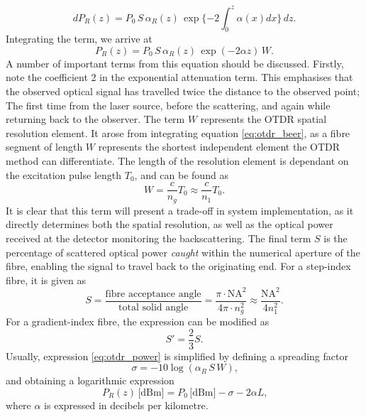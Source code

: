 \documentclass{standalone}
\begin{document}
\begin{equation} \label{eq:otdr_beer}
dP_R(z) = P_0 \, S \, \alpha_R(z) \, \exp\{ -2 \int_{0}^{z} \alpha(x) dx \} \, dz \textrm{.}
\end{equation}
Integrating the term, we arrive at
\begin{equation} \label{eq:otdr_power}
P_R(z) = P_0 \, S \, \alpha_R(z) \, \exp\left(-2 \alpha z\right) \, W \textrm{.}
\end{equation}
A number of important terms from this equation should be discussed. Firstly, note the coefficient 2 in the exponential attenuation term. This emphasises that the observed optical signal has travelled twice the distance to the observed point; The first time from the laser source, before the scattering, and again while returning back to the observer. The term $W$ represents the OTDR spatial resolution element. It arose from integrating equation \ref{eq:otdr_beer}, as a fibre segment of length $W$ represents the shortest independent element the OTDR method can differentiate. The length of the resolution element is dependant on the excitation pulse length $T_0$, and can be found as
\begin{equation} \label{eq:otdr_resolution}
W = \frac{c}{n_g} T_0 \approx \frac{c}{n_1} T_0 \textrm{.}
\end{equation}
It is clear that this term will present a trade-off in system implementation, as it directly determines both the spatial resolution, as well as the optical power received at the detector monitoring the backscattering. The final term $S$ is the percentage of scattered optical power \textit{caught} within the numerical aperture of the fibre, enabling the signal to travel back to the originating end. For a step-index fibre, it is given as
\begin{equation}
S = \frac{\textrm{fibre acceptance angle}}{\textrm{total solid angle}} = \frac{\pi \cdot \textrm{NA}^2}{4 \pi \cdot n_g^2} \approx \frac{\textrm{NA}^2}{4n_1^2} \textrm{.}
\end{equation}
For a gradient-index fibre, the expression can be modified as
\begin{equation}
S' = \frac{2}{3} S \textrm{.}
\end{equation}
Usually, expression \ref{eq:otdr_power} is simplified by defining a spreading factor
\begin{equation}
\sigma = -10 \log \left( \alpha_R \, S \, W \right) \textrm{,}
\end{equation}
and obtaining a logarithmic expression
\begin{equation}
P_R(z) \,\textrm{[dBm]} = P_0 \,\textrm{[dBm]} - \sigma - 2\alpha L \textrm{,}
\end{equation}
where $\alpha$ is expressed in decibels per kilometre. \\
\end{document}
